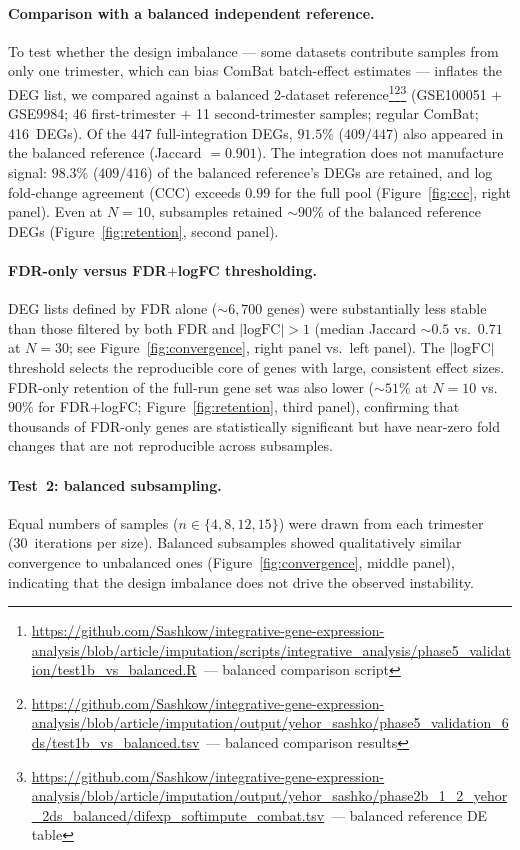 \documentclass[11pt,a4paper]{article}
\newcommand{\ghb}{https://github.com/Sashkow/integrative-gene-expression-analysis/blob/article/imputation}
\newcommand{\src}[2]{\footnote{\url{\ghb/#1}~--- #2}}
\begin{document}
\paragraph{Comparison with a balanced independent reference.}
To test whether the design imbalance --- some datasets
contribute samples from only one trimester, which can bias
ComBat batch-effect estimates --- inflates the DEG
list, we compared against a balanced 2-dataset
reference\src{scripts/integrative_analysis/phase5_validation/test1b_vs_balanced.R}{balanced comparison script}\src{output/yehor_sashko/phase5_validation_6ds/test1b_vs_balanced.tsv}{balanced comparison results}\src{output/yehor_sashko/phase2b_1_2_yehor_2ds_balanced/difexp_softimpute_combat.tsv}{balanced reference DE table}
(GSE100051 $+$ GSE9984; 46 first-trimester $+$ 11
second-trimester samples; regular ComBat; 416~DEGs). Of the
447 full-integration DEGs, $91.5\%$ ($409/447$) also appeared in
the balanced reference (Jaccard $= 0.901$). The integration
does not manufacture signal: $98.3\%$ ($409/416$) of the
balanced reference's DEGs are retained, and log fold-change agreement (CCC) exceeds
$0.99$ for the full pool (Figure~\ref{fig:ccc}, right panel).
Even at $N\!=\!10$, subsamples retained $\sim\!90\%$ of the
balanced reference DEGs (Figure~\ref{fig:retention}, second
panel).

\paragraph{FDR-only versus FDR$+$logFC thresholding.}
DEG lists defined by FDR alone ($\sim\!6{,}700$ genes) were
substantially less stable than those filtered by both FDR and
$|\text{logFC}|\!>\!1$ (median Jaccard $\sim\!0.5$ vs.\ $0.71$
at $N\!=\!30$; see Figure~\ref{fig:convergence}, right panel
vs.\ left panel). The $|\text{logFC}|$ threshold selects the
reproducible core of genes with large, consistent effect sizes.
FDR-only retention of the full-run gene set was also lower
($\sim\!51\%$ at $N\!=\!10$ vs.\ $90\%$ for FDR$+$logFC;
Figure~\ref{fig:retention}, third panel), confirming that
thousands of FDR-only genes are statistically significant but
have near-zero fold changes that are not reproducible across
subsamples.

\paragraph{Test~2: balanced subsampling.}
Equal numbers of samples ($n \in \{4, 8, 12, 15\}$) were drawn
from each trimester (30~iterations per size). Balanced
subsamples showed qualitatively similar convergence to
unbalanced ones (Figure~\ref{fig:convergence}, middle panel),
indicating that the design imbalance does not drive the observed
instability.
\end{document}
